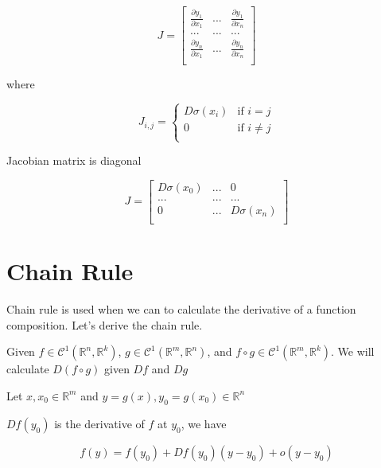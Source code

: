 \documentclass{article}
\begin{document}
\begin{equation}
J = \begin{bmatrix}
\frac{\partial y_1}{\partial x_1} & ... & \frac{\partial y_1}{\partial x_n} \\
... & ... & ... \\
\frac{\partial y_n}{\partial x_1} & ... & \frac{\partial y_n}{\partial x_n} \\
\end{bmatrix}    
\end{equation}

where

\begin{equation}
    J_{i, j} = 
    \begin{cases}
    D\sigma(x_i) &\text{if $i = j$} \\
    0 &\text{if $i \neq j$} \\
    \end{cases}
\end{equation}

Jacobian matrix is diagonal

\begin{equation}
J = \begin{bmatrix}
D\sigma(x_0) & ... & 0 \\
... & ... & ... \\
0 & ... & D\sigma(x_n) \\
\end{bmatrix}    
\end{equation}

\section{Chain Rule}

Chain rule is used when we can to calculate the derivative of a function composition. Let's derive the chain rule.

Given $f \in \mathcal{C}^1(\mathbb{R}^n, \mathbb{R}^k)$, $g \in \mathcal{C}^1(\mathbb{R}^m, \mathbb{R}^n)$, and $f \circ g \in \mathcal{C}^1(\mathbb{R}^m, \mathbb{R}^k)$. We will calculate $D(f \circ g)$ given $Df$ and $Dg$

Let $x, x_0 \in \mathbb{R}^m$ and $y = g(x), y_0 = g(x_0) \in \mathbb{R}^n$

$Df(y_0)$ is the derivative of $f$ at $y_0$, we have

\begin{equation}
    f(y) = f(y_0) + Df(y_0)(y - y_0) + o(y - y_0)
\end{equation}
\end{document}
